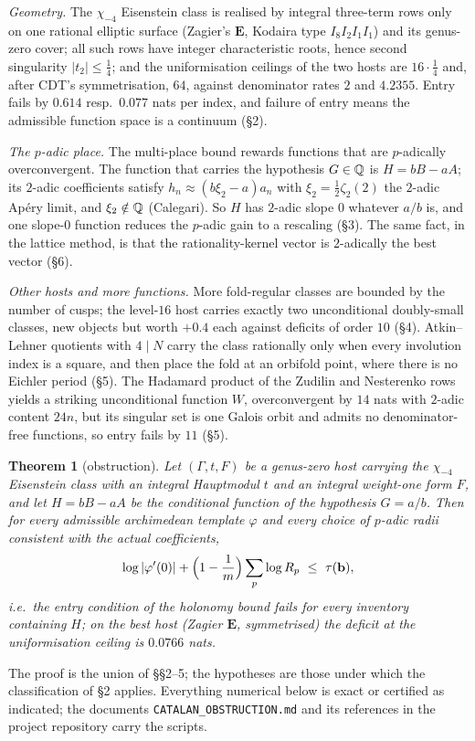 \documentclass[11pt]{amsart}
\newtheorem{theorem}{Theorem}[section]
\theoremstyle{remark}
\begin{document}
\emph{Geometry.} The $\chi_{-4}$ Eisenstein class is realised by integral three-term rows only on one rational elliptic surface (Zagier's $\mathbf E$, Kodaira type $I_8I_2I_1I_1$) and its genus-zero cover; all such rows have integer characteristic roots, hence second singularity $|t_2|\le\tfrac14$; and the uniformisation ceilings of the two hosts are $16\cdot\tfrac14$ and, after CDT's symmetrisation, $64$, against denominator rates $2$ and $4.2355$. Entry fails by $0.614$ resp.\ $0.077$ nats per index, and failure of entry means the admissible function space is a continuum (\S2).

\emph{The $p$-adic place.} The multi-place bound rewards functions that are $p$-adically overconvergent. The function that carries the hypothesis $G\in\mathbb Q$ is $H=bB-aA$; its $2$-adic coefficients satisfy $h_n\approx(b\xi_2-a)a_n$ with $\xi_2=\tfrac12\zeta_2(2)$ the $2$-adic Ap\'ery limit, and $\xi_2\notin\mathbb Q$ (Calegari). So $H$ has $2$-adic slope $0$ whatever $a/b$ is, and one slope-$0$ function reduces the $p$-adic gain to a rescaling (\S3). The same fact, in the lattice method, is that the rationality-kernel vector is $2$-adically the best vector (\S6).

\emph{Other hosts and more functions.} More fold-regular classes are bounded by the number of cusps; the level-$16$ host carries exactly two unconditional doubly-small classes, new objects but worth $+0.4$ each against deficits of order $10$ (\S4). Atkin--Lehner quotients with $4\mid N$ carry the class rationally only when every involution index is a square, and then place the fold at an orbifold point, where there is no Eichler period (\S5). The Hadamard product of the Zudilin and Nesterenko rows yields a striking unconditional function $W$, overconvergent by $14$ nats with $2$-adic content $24n$, but its singular set is one Galois orbit and admits no denominator-free functions, so entry fails by $11$ (\S5).

\begin{theorem}[obstruction]\label{obs}
Let $(\Gamma,t,F)$ be a genus-zero host carrying the $\chi_{-4}$ Eisenstein class with an integral Hauptmodul $t$ and an integral weight-one form $F$, and let $H=bB-aA$ be the conditional function of the hypothesis $G=a/b$. Then for every admissible archimedean template $\varphi$ and every choice of $p$-adic radii consistent with the actual coefficients,
\[\log|\varphi'(0)|+\Bigl(1-\frac1m\Bigr)\sum_p\log R_p\ \le\ \tau(\mathbf b),\]
i.e.\ the entry condition of the holonomy bound fails for every inventory containing $H$; on the best host (Zagier $\mathbf E$, symmetrised) the deficit at the uniformisation ceiling is $0.0766$ nats.
\end{theorem}
The proof is the union of \S\S2--5; the hypotheses are those under which the classification of \S2 applies. Everything numerical below is exact or certified as indicated; the documents \texttt{CATALAN\_OBSTRUCTION.md} and its references in the project repository carry the scripts.
\end{document}
